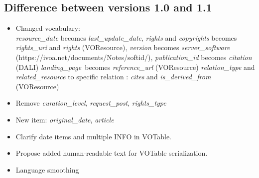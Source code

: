 \documentclass[11pt,a4paper]{ivoa}
\begin{document}
\subsection{Difference between versions 1.0 and 1.1}
\begin{itemize}
\item Changed vocabulary: \\
  \textit{resource\_date} becomes \textit{last\_update\_date},
  \textit{rights} and \textit{copyrights} becomes \textit{rights\_uri} and \textit{rights} (VOResource),
  \textit{version} becomes \textit{server\_software} (https://ivoa.net/documents/Notes/softid/),
  \textit{publication\_id} becomes \textit{citation} (DALI)
  \textit{landing\_page} becomes \textit{reference\_url} (VOResource)
  \textit{relation\_type} and \textit{related\_resource} to specific relation : \textit{cites} and \textit{is\_derived\_from} (VOResource)
\item Remove \textit{curation\_level},
      \textit{request\_post},
      \textit{rights\_type}
\item New item: \textit{original\_date}, \textit{article}
\item Clarify date items and multiple INFO in VOTable.
\item Propose added human-readable text for VOTable serialization.
\item Language smoothing
\end{itemize}


\end{document}
